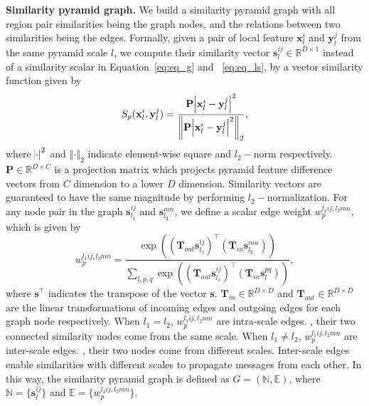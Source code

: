 \documentclass[10pt,twocolumn,letterpaper]{article}
\begin{document}
\textbf{Similarity pyramid graph.} We build a  similarity pyramid graph with all region pair similarities being the graph nodes, and the relations between two similarities
being the edges. Formally, given a pair of local feature $\mathbf{x}_l^{i}$ and $\mathbf{y}_l^{j}$ from the same pyramid scale $l$, we compute their similarity vector $\mathbf{s}_l^{ij}\in \mathbb{R}^{D\times 1}$ instead of a similarity scalar in Equation~\ref{eq:eq_g} and ~\ref{eq:eq_ls}, by a vector similarity function given by
\begin{equation}
S_p(\mathbf{x}_l^i,\mathbf{y}_l^j)=\frac{\mathbf{P}\abs{\mathbf{x}_l^i-\mathbf{y}_l^j}^2}{\left\Vert \mathbf{P}\abs{\mathbf{x}_l^i-\mathbf{y}_l^j}^2\right\Vert_2},
\end{equation}
where $\abs{\cdot}^2$ and $\left\Vert{\cdot}\right\Vert_2$ indicate element-wise square and  $l_2-$norm respectively. $\mathbf{P}\in \mathbb{R}^{D\times C}$ is a projection matrix which projects pyramid feature difference vectors from $C$ dimension to a lower $D$ dimension. Similarity vectors are guaranteed to have the same magnitude by performing $l_2-$normalization. For any node pair in the graph $\mathbf{s}_{l_1}^{ij}$ and $\mathbf{s}_{l_2}^{mn}$, we define a scalar edge weight $w_p^{l_1ij,l_2mn}$, which is given by
\begin{equation}
w_p^{l_1ij,l_2mn}=\frac{\exp({(\mathbf{T}_{out}\mathbf{s}_{l_1}^{ij})}^\intercal(\mathbf{T}_{in}\mathbf{s}_{l_2}^{mn}))}{\sum\limits_{l,p,q}{\exp({(\mathbf{T}_{out}\mathbf{s}_{l_1}^{ij})}^\intercal(\mathbf{T}_{in}\mathbf{s}_{l}^{pq}))}},
\end{equation}
where $\mathbf{s}^\intercal$ indicates the transpose of the vector $\mathbf{s}$. $\mathbf{T}_{in}\in \mathbb{R}^{D\times D}$ and $\mathbf{T}_{out}\in \mathbb{R}^{D\times D}$ are the linear transformations of incoming edges and outgoing edges for each graph node respectively. When $l_1=l_2$, $w_p^{l_1ij,l_2mn}$ are intra-scale  edges. \ie, their two connected similarity nodes come from the same scale. When $l_1\ne l_2$, $w_p^{l_1ij,l_2mn}$ are inter-scale  edges. \ie, their two nodes come from different scales. Inter-scale edges enable similarities with different scales to propagate messages from each other. In this way, the similarity pyramid graph is defined as $G=(\mathbb{N},\mathbb{E})$, where $\mathbb{N}=\{\mathbf{s}_l^{ij}\}$ and $\mathbb{E}=\{w_p^{l_1ij,l_2mn}\}$.
\end{document}
